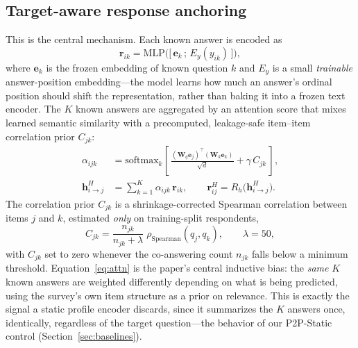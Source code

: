 \documentclass[letterpaper]{article} %
\begin{document}
\subsection{Target-aware response anchoring}
\label{sec:anchoring}
This is the central mechanism. Each known answer is encoded as
\begin{equation}
\bm{r}_{ik} = \mathrm{MLP}\big(\big[\,\bm{e}_k \,;\, E_y(y_{ik})\,\big]\big),
\label{eq:answerenc}
\end{equation}
where $\bm{e}_k$ is the frozen embedding of known question $k$ and $E_y$ is a
small \emph{trainable} answer-position embedding---the model learns how much an
answer's ordinal position should shift the representation, rather than baking
it into a frozen text encoder. The $K$ known answers are aggregated by an
attention score that mixes learned semantic similarity with a precomputed,
leakage-safe item--item correlation prior $C_{jk}$:
\begin{align}
\alpha_{ijk} &= \mathrm{softmax}_k\!\left[\,
   \frac{(\bm{W}_q \bm{e}_j)^{\!\top} (\bm{W}_k \bm{e}_k)}{\sqrt{d}}
   + \gamma\, C_{jk} \,\right],
\label{eq:attn}\\
\bm{h}_{i\to j}^{H} &= \sum_{k=1}^{K}\alpha_{ijk}\, \bm{r}_{ik},
\qquad
\bm{r}_{ij}^{H} = R_h\big(\bm{h}_{i\to j}^{H}\big).
\label{eq:anchor}
\end{align}
The correlation prior $C_{jk}$ is a shrinkage-corrected Spearman correlation
between items $j$ and $k$, estimated \emph{only} on training-split respondents,
\begin{equation}
C_{jk} = \frac{n_{jk}}{n_{jk}+\lambda}\;\rho_{\mathrm{Spearman}}(q_j, q_k),
\qquad \lambda{=}50,
\label{eq:corr}
\end{equation}
with $C_{jk}$ set to zero whenever the co-answering count $n_{jk}$ falls below a
minimum threshold. Equation~\eqref{eq:attn} is the paper's central inductive
bias: the \emph{same} $K$ known answers are weighted differently depending on
what is being predicted, using the survey's own item structure as a prior on
relevance. This is exactly the signal a static profile encoder discards, since
it summarizes the $K$ answers once, identically, regardless of the target
question---the behavior of our P2P-Static control (Section~\ref{sec:baselines}).
\end{document}
